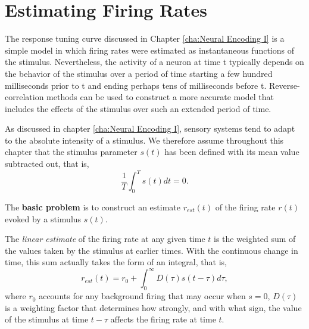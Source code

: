 \section{Estimating Firing Rates}
\label{sec:EstimatingFiringRates}

\begin{rem}
  The response tuning curve discussed in Chapter \ref{cha:Neural Encoding I} is a simple model in which firing rates were estimated as instantaneous functions of the stimulus. Nevertheless, the activity of a neuron at time t typically depends on the behavior of the stimulus over a period of time starting a few hundred milliseconds prior to t and ending perhaps tens of milliseconds before t. Reverse-correlation methods can be used to construct a more accurate model that includes the effects of the stimulus over such an extended period of time.
\end{rem}

\begin{asm}
  \label{asm:stimulus}
  As discussed in chapter \ref{cha:Neural Encoding I}, sensory systems tend to adapt to the absolute intensity of a stimulus. We therefore assume throughout this chapter that the stimulus parameter $s(t)$ has been defined with its mean value subtracted out, that is,
  \begin{equation}
    \label{equ:adaptionAssumption}
    \frac{1}{T}\int_0^Ts(t)dt = 0.
  \end{equation}
\end{asm}

\begin{rem}
  The \textbf{basic problem} is to construct an estimate $r_{est}(t)$ of the firing rate $r(t)$ evoked by a stimulus $s(t)$.
\end{rem}

\begin{defn}
  \label{def:linearEstimate}
  The \emph{linear estimate} of the firing rate at any given time $t$ is the weighted sum of the values taken by the stimulus at earlier times. With the continuous change in time, this sum actually takes the form of an integral, that is,
  \begin{equation}
    \label{equ:2.1}
    r_{est}(t) = r_0 + \int_0^{\infty}D(\tau) s(t-\tau)d\tau,
  \end{equation}
  where $r_0$ accounts for any background firing that may occur when $s = 0$, $D(\tau)$ is a weighting factor that determines how strongly,  and with what sign, the value of the stimulus at time $t-\tau$ affects the firing rate at time $t$.
\end{defn}

